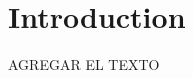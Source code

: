 \documentclass[../main.tex]{subfiles}
\begin{document}

\section{Introduction}
\label{sec:introduction}

AGREGAR EL TEXTO







\end{document}
